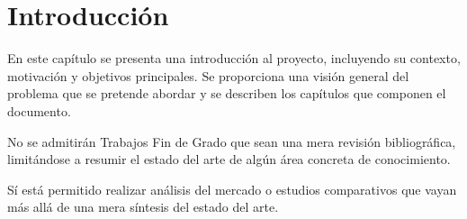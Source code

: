 \chapter[Introducción]{Introducción}
\label{cp:introduction}

\noindent En este capítulo se presenta una introducción al proyecto, incluyendo su contexto, motivación y objetivos principales. Se proporciona una visión general del problema que se pretende abordar y se describen los capítulos que componen el documento.

\begin{advertencia}
No se admitirán Trabajos Fin de Grado que sean una mera revisión bibliográfica, limitándose a resumir el estado del arte de algún área concreta de conocimiento.

Sí está permitido realizar análisis del mercado o estudios comparativos que vayan más allá de una mera síntesis del estado del arte.
\end{advertencia}
